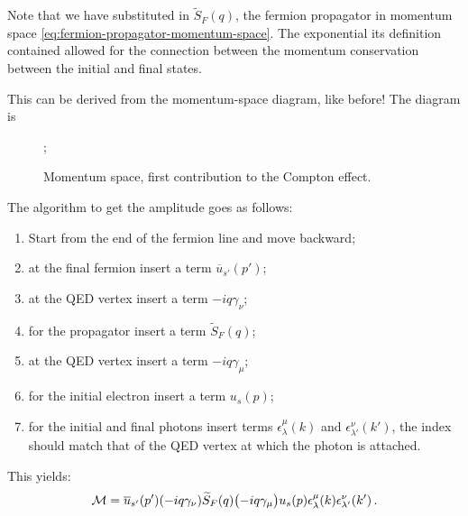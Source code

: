 \documentclass[main.tex]{subfiles}
\begin{document}
Note that we have substituted in \(\widetilde{S}_F(q)\), the fermion propagator in momentum space \eqref{eq:fermion-propagator-momentum-space}.
The exponential its definition contained allowed for the connection between the momentum conservation between the initial and final states. 

This can be derived from the momentum-space diagram, like before! The diagram is 

\begin{figure}[ht]
\centering
{};
\caption{Momentum  space, first contribution to the Compton effect. }
\label{fig:momentum-space-compton}
\end{figure}

The algorithm to get the amplitude goes as follows: 
\begin{enumerate}
    \item Start from the end of the fermion line and move backward;
    \item at the final fermion insert a term \(\overline{u}_{s'} (p')\);
    \item at the QED vertex insert a term \(-iq \gamma_{\nu }\);
    \item for the propagator insert a term \(\widetilde{S}_{F} (q)\);
    \item at the QED vertex insert a term \(-iq \gamma_{\mu }\);
    \item for the initial electron insert a term \(u_s (p)\);
    \item for the initial and final photons insert terms \(\epsilon^{\mu }_{\lambda }(k)\) and \(\epsilon^{\nu }_{\lambda '} (k')\), the index should match that of the QED vertex at which the photon is attached. 
\end{enumerate}

This yields: 
%
\begin{align}
\mathcal{M} = \overline{u}_{s'} (p')
\qty(-iq \gamma_{\nu })
\widetilde{S}_{F} (q)
\qty(-iq \gamma_{\mu })
u_s (p)
\epsilon^{\mu }_{\lambda }(k)
\epsilon^{\nu }_{\lambda '} (k')
\,.
\end{align}
\end{document}
